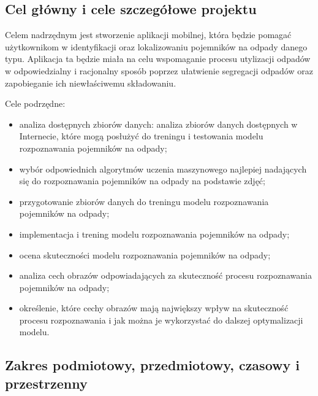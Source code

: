 \documentclass[12pt, a4paper, twoside, openany]{book}
\newcommand{\forceindent}{\leavevmode{\parindent=1.3em\indent}}
\begin{document}
\subsection{Cel główny i cele szczegółowe projektu}

\forceindent Celem nadrzędnym jest stworzenie aplikacji mobilnej, która będzie pomagać użytkownikom w identyfikacji oraz lokalizowaniu pojemników na odpady danego typu. Aplikacja ta będzie miała na celu wspomaganie procesu utylizacji odpadów w odpowiedzialny i racjonalny sposób poprzez ułatwienie segregacji odpadów oraz zapobieganie ich niewłaściwemu składowaniu.

Cele podrzędne:
\begin{itemize}
    \item analiza dostępnych zbiorów danych: analiza zbiorów danych dostępnych w Internecie, które mogą posłużyć do treningu i testowania modelu rozpoznawania pojemników na odpady;
    \item wybór odpowiednich algorytmów uczenia maszynowego najlepiej nadających się do rozpoznawania pojemników na odpady na podstawie zdjęć;
    \item przygotowanie zbiorów danych do treningu modelu rozpoznawania pojemników na odpady;
    \item implementacja i trening modelu rozpoznawania pojemników na odpady;
    \item ocena skuteczności modelu rozpoznawania pojemników na odpady;
    \item analiza cech obrazów odpowiadających za skuteczność procesu rozpoznawania pojemników na odpady;
    \item określenie, które cechy obrazów mają największy wpływ na skuteczność procesu rozpoznawania i jak można je wykorzystać do dalszej optymalizacji modelu.
\end{itemize}

\subsection{Zakres podmiotowy, przedmiotowy, czasowy i przestrzenny}
\end{document}
